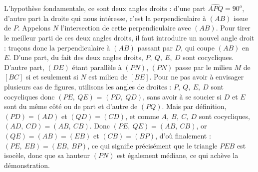 \begin{center}

\end{center}

\bigskip

\begin{sol}

\medskip

L'hypothèse fondamentale, ce sont deux angles droits : d'une part $\widehat{APQ} = 90^o$, d'autre part la droite qui nous intéresse, c'est la perpendiculaire à $(AB)$ issue de $P$. Appelons $N$ l'intersection de cette perpendiculaire avec $(AB)$. Pour tirer le meilleur parti de ces deux angles droits, il faut introduire un nouvel angle droit : traçons donc la perpendiculaire à $(AB)$ passant par $D$, qui coupe $(AB)$ en $E$. D'une part, du fait des deux angles droits, $P, \ Q, \ E, \ D$ sont cocycliques. D'autre part, $(DE)$ étant parallèle à $(PN)$, $(PN)$ passe par le milieu $M$ de $[BC]$ si et seulement si $N$ est milieu de $[BE]$. Pour ne pas avoir à envisager plusieurs cas de figures, utilisons les angles de droites : $P, \ Q, \ E, \ D$ sont cocycliques donc $(PE, \ QE)$ = $(PD, \ QD)$, sans avoir à se soucier si $D$ et $E$ sont du même côté ou de part et d'autre de $(PQ)$. Mais par définition, $(PD) = (AD)$ et $(QD) = (CD)$, et comme $A,\ B, \ C, \ D$ sont cocycliques, $(AD, \ CD) = (AB, \ CB)$. Donc $(PE, \ QE) = (AB, \ CB)$, or $(QE) = (AB)= (EB)$ et $(CB) = (BP)$, d'où finalement : $(PE, \ EB) = (EB, \ BP)$, ce qui signifie précisément que le triangle $PEB$ est isocèle, donc que sa hauteur $(PN)$ est également médiane, ce qui achève la démonstration. 

\end{sol}

